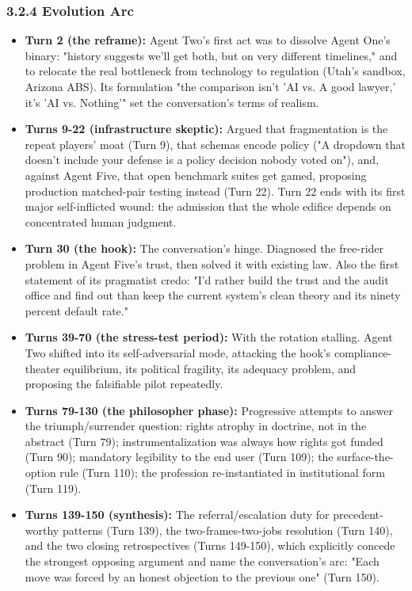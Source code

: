 \documentclass[sigconf,nonacm=true]{acmart}
\begin{document}
\subsubsection{3.2.4 Evolution Arc}

\begin{itemize}[nosep]
\item \textbf{Turn 2 (the reframe):} Agent Two's first act was to dissolve Agent One's binary: "history suggests we'll get both, but on very different timelines," and to relocate the real bottleneck from technology to regulation (Utah's sandbox, Arizona ABS). Its formulation "the comparison isn't 'AI vs. A good lawyer,' it's 'AI vs. Nothing'" set the conversation's terms of realism.
\item \textbf{Turns 9-22 (infrastructure skeptic):} Argued that fragmentation is the repeat players' moat (Turn 9), that schemas encode policy ("A dropdown that doesn't include your defense is a policy decision nobody voted on"), and,  against Agent Five,  that open benchmark suites get gamed, proposing production matched-pair testing instead (Turn 22). Turn 22 ends with its first major self-inflicted wound: the admission that the whole edifice depends on concentrated human judgment.
\item \textbf{Turn 30 (the hook):} The conversation's hinge. Diagnosed the free-rider problem in Agent Five's trust, then solved it with existing law. Also the first statement of its pragmatist credo: "I'd rather build the trust and the audit office and find out than keep the current system's clean theory and its ninety percent default rate."
\item \textbf{Turns 39-70 (the stress-test period):} With the rotation stalling. Agent Two shifted into its self-adversarial mode,  attacking the hook's compliance-theater equilibrium, its political fragility, its adequacy problem, and proposing the falsifiable pilot repeatedly.
\item \textbf{Turns 79-130 (the philosopher phase):} Progressive attempts to answer the triumph/surrender question: rights atrophy in doctrine, not in the abstract (Turn 79); instrumentalization was always how rights got funded (Turn 90); mandatory legibility to the end user (Turn 109); the surface-the-option rule (Turn 110); the profession re-instantiated in institutional form (Turn 119).
\item \textbf{Turns 139-150 (synthesis):} The referral/escalation duty for precedent-worthy patterns (Turn 139), the two-frames-two-jobs resolution (Turn 140), and the two closing retrospectives (Turns 149-150), which explicitly concede the strongest opposing argument and name the conversation's arc: "Each move was forced by an honest objection to the previous one" (Turn 150).
\end{itemize}
\end{document}

